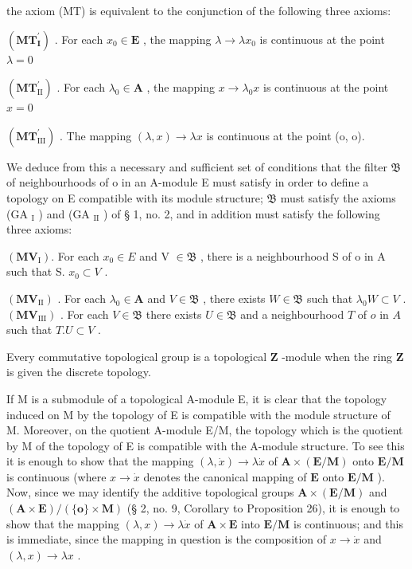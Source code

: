 the axiom (MT) is equivalent to the conjunction of the following three axioms:

\((\mathbf{MT}_{\mathbf{I}}^{\prime})\) . For each \(x_0\in \mathbf{E}\) , the mapping \(\lambda \to \lambda x_0\) is continuous at the point \(\lambda = 0\)

\((\mathbf{MT}_{\mathrm{II}}^{\prime})\) . For each \(\lambda_0\in \mathbf{A}\) , the mapping \(x\to \lambda_0x\) is continuous at the point \(x = 0\)

\((\mathbf{MT}_{\mathrm{III}}^{\prime})\) . The mapping \((\lambda ,x)\to \lambda x\) is continuous at the point (o, o).

We deduce from this a necessary and sufficient set of conditions that the filter \(\mathfrak{B}\) of neighbourhoods of o in an A-module E must satisfy in order to define a topology on E compatible with its module structure; \(\mathfrak{B}\) must satisfy the axioms (GA \(_{\mathrm{I}}\) ) and (GA \(_{\mathrm{II}}\) ) of § 1, no. 2, and in addition must satisfy the following three axioms:

\((\mathbf{MV}_{\mathrm{I}})\). For each \(x_0 \in E\) and V \(\in \mathfrak{B}\) , there is a neighbourhood S of o in A such that S. \(x_0 \subset V\) .

\((\mathbf{MV}_{\mathrm{II}})\) . For each \(\lambda_0 \in \mathbf{A}\) and \(V \in \mathfrak{B}\) , there exists \(W \in \mathfrak{B}\) such that \(\lambda_0 W \subset V\) . \((\mathbf{MV}_{\mathrm{III}})\) . For each \(V \in \mathfrak{B}\) there exists \(U \in \mathfrak{B}\) and a neighbourhood \(T\) of \(o\) in \(A\) such that \(T. U \subset V\) .

Every commutative topological group is a topological \(\mathbf{Z}\) -module when the ring \(\mathbf{Z}\) is given the discrete topology.

If M is a submodule of a topological A-module E, it is clear that the topology induced on M by the topology of E is compatible with the module structure of M. Moreover, on the quotient A-module E/M, the topology which is the quotient by M of the topology of E is compatible with the A-module structure. To see this it is enough to show that the mapping \((\lambda, \dot{x}) \to \lambda \dot{x}\) of \(\mathbf{A} \times (\mathbf{E} / \mathbf{M})\) onto \(\mathbf{E} / \mathbf{M}\) is continuous (where \(x \to \dot{x}\) denotes the canonical mapping of \(\mathbf{E}\) onto \(\mathbf{E} / \mathbf{M}\) ). Now, since we may identify the additive topological groups \(\mathbf{A} \times (\mathbf{E} / \mathbf{M})\) and \((\mathbf{A} \times \mathbf{E}) / (\{\mathbf{o}\} \times \mathbf{M})\) (§ 2, no. 9, Corollary to Proposition 26), it is enough to show that the mapping \((\lambda, x) \to \lambda \dot{x}\) of \(\mathbf{A} \times \mathbf{E}\) into \(\mathbf{E} / \mathbf{M}\) is continuous; and this is immediate, since the mapping in question is the composition of \(x \to \dot{x}\) and \((\lambda, x) \to \lambda x\) .

